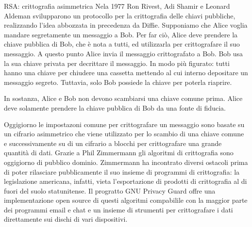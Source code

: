 \documentclass[final,hyperref={pdfpagelabels=false}]{beamer}
\begin{document}
\begin{frame}{}
\begin{columns}[t]
\begin{column}{.3\linewidth}
        \begin{block}{RSA: crittografia asimmetrica}
          Nela 1977 Ron Rivest, Adi Shamir e Leonard Aldeman svilupparono un protocollo per la crittografia delle chiavi pubbliche, realizzando l'idea abbozzata in precedenza da Diffie. Supponiamo che Alice voglia mandare segretamente un messaggio a Bob. Per far ciò, Alice deve prendere la chiave pubblica di Bob, che è nota a tutti, ed utilizzarla per crittografare il suo messaggio. A questo punto Alice invia il messaggio crittografato a Bob. Bob usa la sua chiave privata per decrittare il messaggio. In modo più figurato: tutti hanno una chiave per chiudere una cassetta mettendo al cui interno depositare un messaggio segreto. Tuttavia, solo Bob possiede la chiave per poterla riaprire. \par
          In sostanza, Alice e Bob non devono scambiarsi una chiave comune prima. Alice deve solamente prendere la chiave pubblica di Bob da una fonte di fiducia. \par
          Oggigiorno le impostazoni comune per crittografare un messaggio sono basate su un cifrario asimmetrico che viene utilizzato per lo scambio di una chiave comune e successivamente su di un cifrario a blocchi per crittografare una grande quantità di dati. Grazie a Phil Zimmermann gli algoritmi di crittografia sono oggigiorno di pubblico dominio. Zimmermann ha incontrato diversi ostacoli prima di poter rilasciare pubblicamente il suo insieme di programmi di crittografia: la legislazione americana, infatti, vieta l'esportazione di prodotti di crittografia al di fuori del suolo statunitense. Il progratto GNU Privacy Guard offre una implementazione open source di questi algoritmi compabilile con la maggior parte dei programmi email e chat e un insieme di strumenti per crittografare i dati direttamente sui dischi di vari dispositivi.
        \end{block}


\end{column}
\end{columns}
\end{frame}
\end{document}
